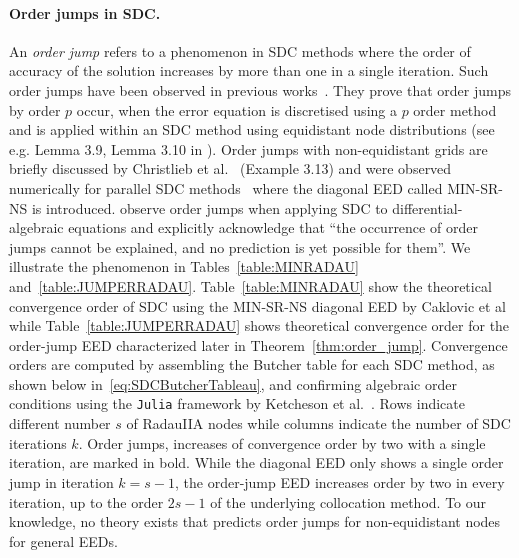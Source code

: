 \documentclass[sn-mathphys-num]{sn-jnl}%
\newcommand{\reva}[1]{#1}%
\theoremstyle{thmstyleone}%
\theoremstyle{thmstyletwo}%
\theoremstyle{thmstylethree}%
\begin{document}
\paragraph{Order jumps in SDC.}
An \emph{order jump} refers to a phenomenon in SDC methods where the order of accuracy of the solution increases by more than one in a single iteration.
Such order jumps have been observed in previous works~\citep{HansenStrain2011,HansenStrain2006,ChristliebEtAl2009,ChristliebEtAl2010_MoC}. 
They prove that order jumps by order $p$ occur, when the error equation is discretised using a $p$ order method and is applied within an SDC method using equidistant node distributions (see e.g. Lemma 3.9, Lemma 3.10 in \citep{ChristliebEtAl2009}).
Order jumps with non-equidistant grids are briefly discussed by Christlieb et al.~\citep{ChristliebEtAl2009} (Example 3.13) and were observed numerically for parallel SDC methods~\citep{CaklovicEtAl2025} where the diagonal EED called MIN-SR-NS is introduced.
\reva{\citet{Bolten2026} observe order jumps when applying SDC to differential-algebraic equations and explicitly acknowledge that ``the occurrence of order jumps cannot be explained, and no prediction is
yet possible for them''.}
\reva{We illustrate the phenomenon in Tables~\ref{table:MINRADAU} and~\ref{table:JUMPERRADAU}.
Table~\ref{table:MINRADAU} show the theoretical convergence order of SDC using the MIN-SR-NS diagonal EED by Caklovic et al~\cite{CaklovicEtAl2025} while Table~\ref{table:JUMPERRADAU} shows theoretical convergence order for the order-jump EED characterized later in Theorem~\ref{thm:order_jump}.
Convergence orders are computed by assembling the Butcher table for each SDC method, as shown below in~\eqref{eq:SDCButcherTableau}, and confirming algebraic order conditions using the \texttt{Julia} framework by Ketcheson et al.~\cite{Ketcheson2023}.
Rows indicate different number $s$ of RadauIIA nodes while columns indicate the number of SDC iterations $k$.
Order jumps, increases of convergence order by two with a single iteration, are marked in bold.
While the diagonal EED only shows a single order jump in iteration $k = s-1$, the order-jump EED increases order by two in every iteration, up to the order $2s-1$ of the underlying collocation method.
To our knowledge, no theory exists that predicts order jumps for non-equidistant nodes for general EEDs.
}
\end{document}
